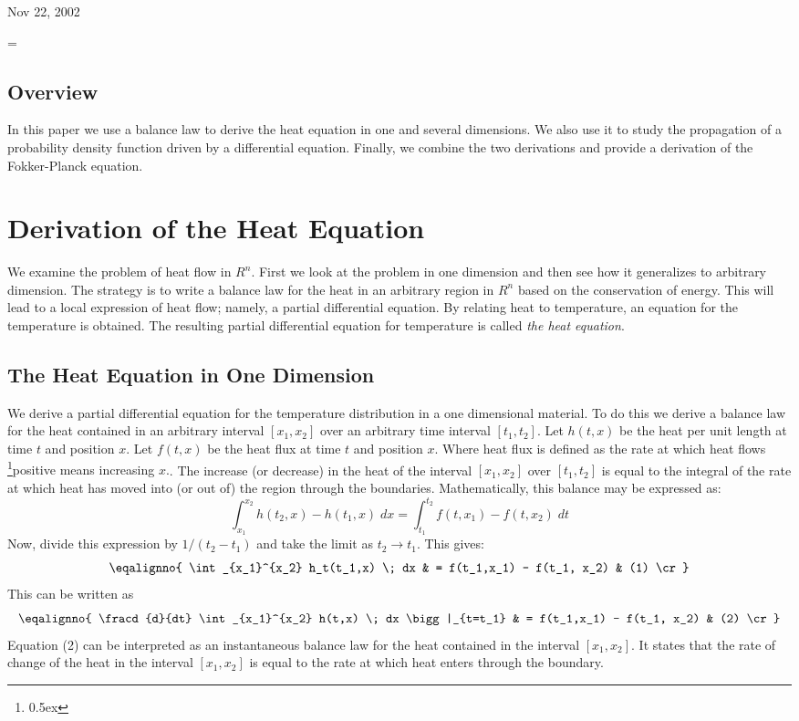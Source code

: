 
\parindent=0pt

{Nov 22, 2002}

\parskip=\baselineskip
\subsection{Overview}

In this paper we use a balance law to derive the heat equation in one and 
several dimensions. We also use it to study the propagation of a probability
density function driven by a differential equation. Finally, we combine the 
two derivations and provide a derivation of the Fokker-Planck equation.


\section{Derivation of the Heat Equation}

We examine the problem of heat flow in $R^n$. First we look at the 
problem in one dimension and then see how it generalizes to arbitrary
dimension. The strategy is to write a balance law for the heat in 
an arbitrary region in $R^n$ based on the conservation of energy. 
This will lead to a local expression of heat flow;
namely, a partial differential equation. By relating heat to temperature, 
an equation for the temperature is obtained. 
The resulting partial differential equation for temperature is called 
{\it the heat equation\/}.


\subsection{The Heat Equation in One Dimension}
We derive a partial differential equation for the temperature distribution 
in a one dimensional material. To do this we 
derive a balance law for the heat contained in an arbitrary interval 
$[x_1,x_2]$ over an arbitrary time interval $[t_1, t_2]$. 
Let $h(t,x)$ be the 
heat per unit length at time $t$ and position $x$. Let 
$f(t,x)$ be the heat flux at time $t$ and position $x$. Where heat 
flux is defined as the rate at which heat flows
\footnote{\kern -2pt \raise 0.5ex \hbox{\dag}}{positive means 
increasing $x$.}. The increase (or decrease) in 
the heat of 
the interval $[x_1, x_2]$ over $[t_1, t_2]$ is equal to the integral of
the rate at 
which heat has moved into (or out of) the region through the boundaries.
Mathematically, this balance may be expressed as:
$$
\int_{x_1}^{x_2} h(t_2,x) - h(t_1,x) \; dx  = 
\int_{t_1}^{t_2} f(t, x_1) - f(t,x_2) \; dt
$$
Now, divide this expression by $1 / (t_2 - t_1)$ and take the 
limit as $t_2 \rightarrow t_1$. This gives:
$$
\eqalignno{
\int_{x_1}^{x_2} h_t(t_1,x) \; dx & = f(t_1,x_1) - f(t_1, x_2) & (1) \cr}
$$
This can be written as
$$
\eqalignno{
\fracd{d}{dt} \int_{x_1}^{x_2} h(t,x) \; dx \bigg|_{t=t_1} & 
= f(t_1,x_1) - f(t_1, x_2) 
& (2) \cr}
$$
Equation (2) can be interpreted as an instantaneous balance law for the 
heat contained in the interval $[x_1, x_2]$. It states that the rate of 
change of the heat in the interval $[x_1, x_2]$ is equal to the rate 
at which heat enters through the boundary.


